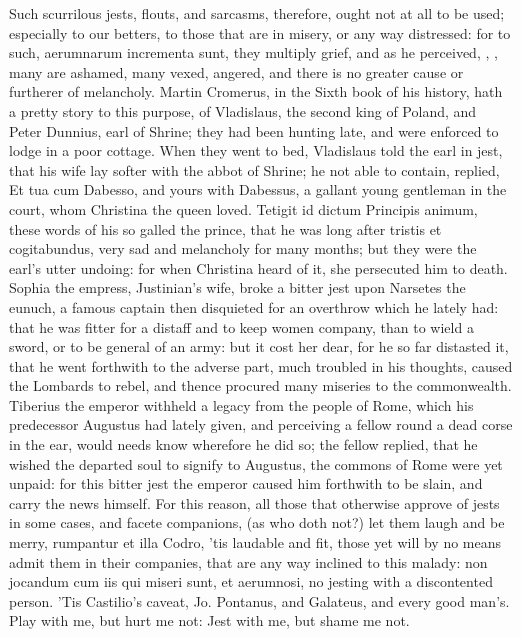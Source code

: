 {{Such scurrilous jests, flouts, and sarcasms, therefore, ought not at
all to be used; especially to our betters, to those that are in misery,
or any way distressed: for to such, aerumnarum incrementa sunt, they
multiply grief, and as he perceived, , \etc{}, many are ashamed, many vexed, angered, and there is no
greater cause or furtherer of melancholy. Martin Cromerus, in the Sixth
book of his history, hath a pretty story to this purpose, of
Vladislaus, the second king of Poland, and Peter Dunnius, earl of
Shrine; they had been hunting late, and were enforced to lodge in a
poor cottage. When they went to bed, Vladislaus told the earl in jest,
that his wife lay softer with the abbot of Shrine; he not able to
contain, replied, Et tua cum Dabesso, and yours with Dabessus, a
gallant young gentleman in the court, whom Christina the queen loved.
Tetigit id dictum Principis animum, these words of his so galled the
prince, that he was long after tristis et cogitabundus, very sad and
melancholy for many months; but they were the earl's utter undoing: for
when Christina heard of it, she persecuted him to death. Sophia the
empress, Justinian's wife, broke a bitter jest upon Narsetes the
eunuch, a famous captain then disquieted for an overthrow which he
lately had: that he was fitter for a distaff and to keep women company,
than to wield a sword, or to be general of an army: but it cost her
dear, for he so far distasted it, that he went forthwith to the adverse
part, much troubled in his thoughts, caused the Lombards to rebel, and
thence procured many miseries to the commonwealth. Tiberius the emperor
withheld a legacy from the people of Rome, which his predecessor
Augustus had lately given, and perceiving a fellow round a dead corse
in the ear, would needs know wherefore he did so; the fellow replied,
that he wished the departed soul to signify to Augustus, the commons of
Rome were yet unpaid: for this bitter jest the emperor caused him
forthwith to be slain, and carry the news himself. For this reason, all
those that otherwise approve of jests in some cases, and facete
companions, (as who doth not?) let them laugh and be merry, rumpantur
et illa Codro, 'tis laudable and fit, those yet will by no means admit
them in their companies, that are any way inclined to this malady: non
jocandum cum iis qui miseri sunt, et aerumnosi, no jesting with a
discontented person. 'Tis Castilio's caveat, Jo. Pontanus, and
Galateus, and every good man's.
Play with me, but hurt me not:
Jest with me, but shame me not.

}}
